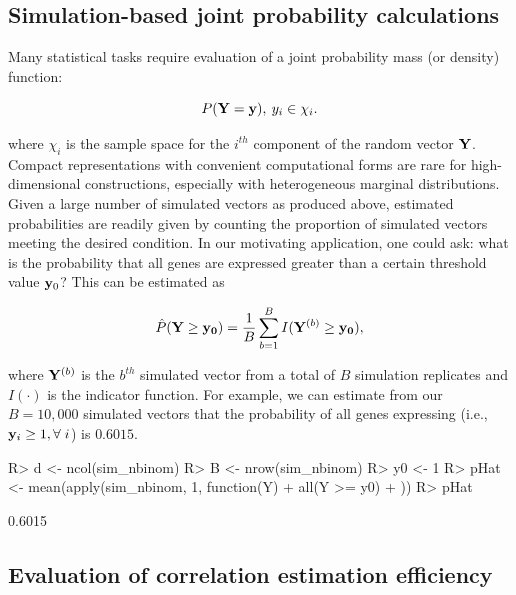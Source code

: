 \documentclass[
]{jss}
\begin{document}
\hypertarget{simulation-based-joint-probability-calculations}{%
\subsection{Simulation-based joint probability
calculations}\label{simulation-based-joint-probability-calculations}}

Many statistical tasks require evaluation of a joint probability mass
(or density) function:

\[
P( {\bf Y} = {\bf y} ), \: y_i \in \chi_i.
\]

where \(\chi_i\) is the sample space for the \(i^{th}\) component of the
random vector \(\bf{Y}\). Compact representations with convenient
computational forms are rare for high-dimensional constructions,
especially with heterogeneous marginal distributions. Given a large
number of simulated vectors as produced above, estimated probabilities
are readily given by counting the proportion of simulated vectors
meeting the desired condition. In our motivating application, one could
ask: what is the probability that all genes are expressed greater than a
certain threshold value \({\bf y}_0\)? This can be estimated as

\[
\hat{P}( {\bf Y} \ge {\bf y_0 } ) = \frac{1}{B} \sum_{b=1}^B I( {\bf Y}^{ (b) } \ge {\bf y_0} ),
\]

where \({\bf Y}^{(b)}\) is the \(b^{th}\) simulated vector from a total
of \(B\) simulation replicates and \(I(\cdot)\) is the indicator
function. For example, we can estimate from our \(B=10,000\) simulated
vectors that the probability of all genes expressing (i.e.,
\({\bf y}_i \geq 1, \forall \; i\)) is \(0.6015\).

\begin{CodeChunk}
\begin{CodeInput}
R> d <- ncol(sim_nbinom)
R> B <- nrow(sim_nbinom)
R> y0 <- 1
R> pHat <- mean(apply(sim_nbinom, 1, function(Y) {
+   all(Y >= y0)
+ }))
R> pHat
\end{CodeInput}
\begin{CodeOutput}
[1] 0.6015
\end{CodeOutput}
\end{CodeChunk}

\hypertarget{evaluation-of-correlation-estimation-efficiency}{%
\subsection{Evaluation of correlation estimation
efficiency}\label{evaluation-of-correlation-estimation-efficiency}}
\end{document}
